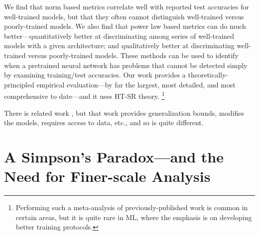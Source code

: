 \documentclass{article}
\begin{document}
We find that norm based metrics correlate well with reported test accuracies for well-trained models, but that they often cannot distinguish well-trained versus poorly-trained models.
We also find that power law based metrics can do much better---quantitatively better at discriminating among series of well-trained models with a given architecture; and qualitatively better at discriminating well-trained versus poorly-trained models.
These methods can be used to identify when a pretrained neural network has problems that cannot be detected simply by examining training/test accuracies.
%
%
Our work provides a theoretically-principled empirical evaluation---by far the largest, most detailed, and most comprehensive to date---and it uses HT-SR theory.%
\footnote{Performing such a meta-analysis of previously-published work is common in certain areas, but it is quite rare in ML, where the emphasis is on developing better training protocols.}

There is related work \citep{BFT17_TR,LMBx18_TR}, but that work provides generalization bounds, modifies the models, requires access to data, etc., and so is quite different.




\section{A Simpson's Paradox---and the Need for Finer-scale Analysis}
\end{document}
